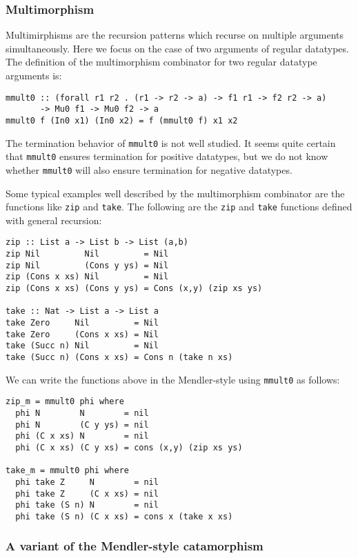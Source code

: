 \documentclass[letterpaper,12pt]{article}
\begin{document}
\subsubsection{Multimorphism} \label{sec:bg:more:mmult}
Multimirphisms are the recursion patterns
which recurse on multiple arguments simultaneously.
Here we focus on the case of two arguments of regular datatypes.
The definition of the multimorphism combinator for
two regular datatype arguments is:
\begin{verbatim}
mmult0 :: (forall r1 r2 . (r1 -> r2 -> a) -> f1 r1 -> f2 r2 -> a)
       -> Mu0 f1 -> Mu0 f2 -> a
mmult0 f (In0 x1) (In0 x2) = f (mmult0 f) x1 x2
\end{verbatim}
The termination behavior of \verb|mmult0| is not well studied.
It seems quite certain that \verb|mmult0| ensures termination
for positive datatypes, but we do not know whether \verb|mmult0|
will also ensure termination for negative datatypes.

Some typical examples well described by the multimorphism
combinator are the functions like \verb|zip| and \verb|take|.
The following are the \verb|zip| and \verb|take| functions
defined with general recursion:
\begin{verbatim}
zip :: List a -> List b -> List (a,b)
zip Nil         Nil         = Nil
zip Nil         (Cons y ys) = Nil
zip (Cons x xs) Nil         = Nil
zip (Cons x xs) (Cons y ys) = Cons (x,y) (zip xs ys)

take :: Nat -> List a -> List a
take Zero     Nil         = Nil
take Zero     (Cons x xs) = Nil
take (Succ n) Nil         = Nil
take (Succ n) (Cons x xs) = Cons n (take n xs)
\end{verbatim}
We can write the functions above in the Mendler-style
using \verb|mmult0| as follows:
\begin{verbatim}
zip_m = mmult0 phi where
  phi N        N        = nil
  phi N        (C y ys) = nil
  phi (C x xs) N        = nil
  phi (C x xs) (C y xs) = cons (x,y) (zip xs ys)

take_m = mmult0 phi where
  phi take Z     N        = nil
  phi take Z     (C x xs) = nil
  phi take (S n) N        = nil
  phi take (S n) (C x xs) = cons x (take x xs)
\end{verbatim}

\subsubsection{A variant of the Mendler-style catamorphism}
\label{sec:bg:more:crawei}
\end{document}
